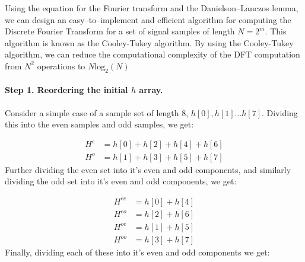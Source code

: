 \documentclass[10pt]{article}
\begin{document}
Using the equation for the Fourier transform and the Danielson--Lanczos
lemma, we can design an easy--to--implement and efficient algorithm for 
computing the Discrete Fourier Transform for a set of signal
samples of length $N = 2^m$.  This algorithm is known as the Cooley-Tukey
algorithm.  By using the Cooley-Tukey algorithm, we can reduce the
computational complexity of the DFT computation from $N^2$ operations
to $N\mbox{log}_2(N)$

\paragraph{Step 1. Reordering the initial $h$ array.}

Consider a simple case of a sample set of length $8$, $h[0], h[1] \ldots h[7]$.
Dividing this into the even samples and odd samples, we get:

\begin{equation}
\begin{aligned}
H^e & = h[0] + h[2] + h[4] + h[6] \\
H^o & = h[1] + h[3] + h[5] + h[7]
\end{aligned}
\end{equation}
Further dividing the even set into it's even and odd components, and 
similarly dividing the odd set into it's even and odd components, we get:

\begin{equation}
\label{Eq:TwoLength}
\begin{aligned}
H^{ee} & = h[0] + h[4] \\
H^{eo} & = h[2] + h[6] \\
H^{oe} & = h[1] + h[5] \\
H^{oo} & = h[3] + h[7]
\end{aligned}
\end{equation}
Finally, dividing each of these into it's even and odd components we get:
\end{document}
